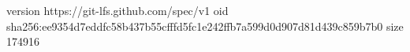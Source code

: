 version https://git-lfs.github.com/spec/v1
oid sha256:ee9354d7eddfc58b437b55cfffd5fc1e242ffb7a599d0d907d81d439c859b7b0
size 174916
